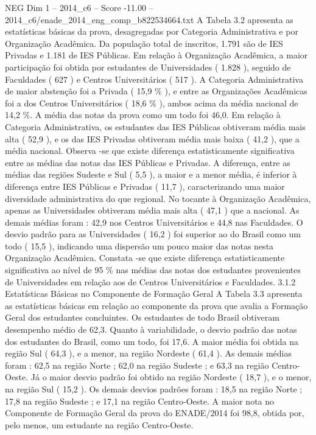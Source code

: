 \begin{textsample}{NEG Dim 1 – 2014\_c6 – Score -11.00 – 2014\_c6/enade\_2014\_eng\_comp\_b822534664.txt}
A Tabela 3.2 apresenta as estatísticas básicas da prova, desagregadas por Categoria Administrativa e por Organização Acadêmica.
Da população total de inscritos, 1.791 são de IES Privadas e 1.181 de IES Públicas.
Em relação à Organização Acadêmica, a maior participação foi obtida por estudantes de Universidades ( 1.828 ), seguido de Faculdades ( 627 ) e Centros Universitários ( 517 ).
A Categoria Administrativa de maior abstenção foi a Privada ( 15,9 \% ), e entre as Organizações Acadêmicas foi a dos Centros Universitários ( 18,6 \% ), ambos acima da média nacional de 14,2 \%.
A média das notas da prova como um todo foi 46,0.
Em relação à Categoria Administrativa, os estudantes das IES Públicas obtiveram média mais alta ( 52,9 ), e os das IES Privadas obtiveram média mais baixa ( 41,2 ), que a média nacional.
Observa -se que existe diferença estatisticamente significativa entre as médias das notas das IES Públicas e Privadas.
A diferença, entre as médias das regiões Sudeste e Sul ( 5,5 ), a maior e a menor média, é inferior à diferença entre IES Públicas e Privadas ( 11,7 ), caracterizando uma maior diversidade administrativa do que regional.
No tocante à Organização Acadêmica, apenas as Universidades obtiveram média mais alta ( 47,1 ) que a nacional.
As demais médias foram : 42,9 nos Centros Universitários e 44,8 nas Faculdades.
O desvio padrão para as Universidades ( 16,2 ) foi superior ao do Brasil como um todo ( 15,5 ), indicando uma dispersão um pouco maior das notas nesta Organização Acadêmica.
Constata -se que existe diferença estatisticamente significativa ao nível de 95 \% nas médias das notas dos estudantes provenientes de Universidades em relação aos de Centros Universitários e Faculdades. 3.1.2 Estatísticas Básicas no Componente de Formação Geral A Tabela 3.3 apresenta as estatísticas básicas em relação ao componente da prova que avalia a Formação Geral dos estudantes concluintes.
Os estudantes de todo Brasil obtiveram desempenho médio de 62,3.
Quanto à variabilidade, o desvio padrão das notas dos estudantes do Brasil, como um todo, foi 17,6.
A maior média foi obtida na região Sul ( 64,3 ), e a menor, na região Nordeste ( 61,4 ).
As demais médias foram : 62,5 na região Norte ; 62,0 na região Sudeste ; e 63,3 na região Centro-Oeste.
Já o maior desvio padrão foi obtido na região Nordeste ( 18,7 ), e o menor, na região Sul ( 15,2 ).
Os demais desvios padrões foram : 18,5 na região Norte ; 17,8 na região Sudeste ; e 17,1 na região Centro-Oeste.
A maior nota no Componente de Formação Geral da prova do ENADE/2014 foi 98,8, obtida por, pelo menos, um estudante na região Centro-Oeste.

\end{textsample}
